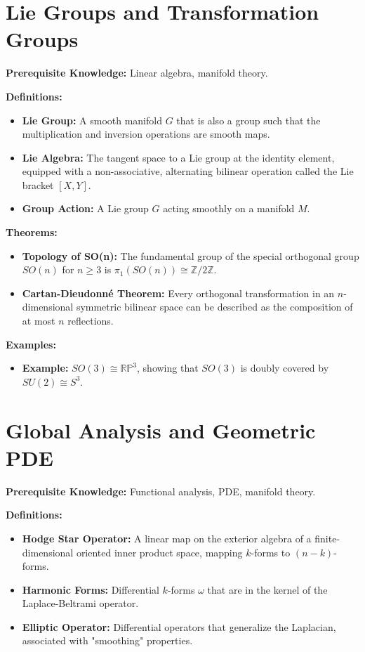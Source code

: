 \section{Lie Groups and Transformation Groups}
\textbf{Prerequisite Knowledge:} Linear algebra, manifold theory.

\textbf{Definitions:}
\begin{itemize}
    \item \textbf{Lie Group:} A smooth manifold $G$ that is also a group such that the multiplication and inversion operations are smooth maps.
    \item \textbf{Lie Algebra:} The tangent space to a Lie group at the identity element, equipped with a non-associative, alternating bilinear operation called the Lie bracket $[X, Y]$.
    \item \textbf{Group Action:} A Lie group $G$ acting smoothly on a manifold $M$.
\end{itemize}

\textbf{Theorems:}
\begin{itemize}
    \item \textbf{Topology of SO(n):} The fundamental group of the special orthogonal group $SO(n)$ for $n \ge 3$ is $\pi_1(SO(n)) \cong \mathbb{Z}/2\mathbb{Z}$.
    \item \textbf{Cartan-Dieudonn\'e Theorem:} Every orthogonal transformation in an $n$-dimensional symmetric bilinear space can be described as the composition of at most $n$ reflections.
\end{itemize}

\textbf{Examples:}
\begin{itemize}
    \item \textbf{Example:} $SO(3) \cong \mathbb{RP}^3$, showing that $SO(3)$ is doubly covered by $SU(2) \cong S^3$.
\end{itemize}

\section{Global Analysis and Geometric PDE}
\textbf{Prerequisite Knowledge:} Functional analysis, PDE, manifold theory.

\textbf{Definitions:}
\begin{itemize}
    \item \textbf{Hodge Star Operator:} A linear map on the exterior algebra of a finite-dimensional oriented inner product space, mapping $k$-forms to $(n-k)$-forms.
    \item \textbf{Harmonic Forms:} Differential $k$-forms $\omega$ that are in the kernel of the Laplace-Beltrami operator.
    \item \textbf{Elliptic Operator:} Differential operators that generalize the Laplacian, associated with "smoothing" properties.
\end{itemize}

